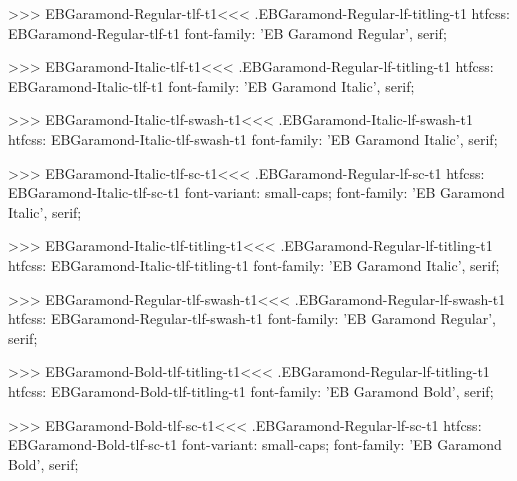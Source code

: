 {{{{{{{>>>
\<EBGaramond-Regular-tlf-t1\><<<
.EBGaramond-Regular-lf-titling-t1
htfcss:  EBGaramond-Regular-tlf-t1  font-family: 'EB Garamond Regular', serif;

>>>
\<EBGaramond-Italic-tlf-t1\><<<
.EBGaramond-Regular-lf-titling-t1
htfcss:  EBGaramond-Italic-tlf-t1  font-family: 'EB Garamond Italic', serif;

>>>
\<EBGaramond-Italic-tlf-swash-t1\><<<
.EBGaramond-Italic-lf-swash-t1
htfcss:  EBGaramond-Italic-tlf-swash-t1  font-family: 'EB Garamond Italic', serif;

>>>
\<EBGaramond-Italic-tlf-sc-t1\><<<
.EBGaramond-Regular-lf-sc-t1
htfcss:  EBGaramond-Italic-tlf-sc-t1  font-variant: small-caps; font-family: 'EB Garamond Italic', serif;

>>>
\<EBGaramond-Italic-tlf-titling-t1\><<<
.EBGaramond-Regular-lf-titling-t1
htfcss:  EBGaramond-Italic-tlf-titling-t1  font-family: 'EB Garamond Italic', serif;

>>>
\<EBGaramond-Regular-tlf-swash-t1\><<<
.EBGaramond-Regular-lf-swash-t1
htfcss:  EBGaramond-Regular-tlf-swash-t1  font-family: 'EB Garamond Regular', serif;

>>>
\<EBGaramond-Bold-tlf-titling-t1\><<<
.EBGaramond-Regular-lf-titling-t1
htfcss:  EBGaramond-Bold-tlf-titling-t1  font-family: 'EB Garamond Bold', serif;

>>>
\<EBGaramond-Bold-tlf-sc-t1\><<<
.EBGaramond-Regular-lf-sc-t1
htfcss:  EBGaramond-Bold-tlf-sc-t1  font-variant: small-caps; font-family: 'EB Garamond Bold', serif;

}}}}}}}
